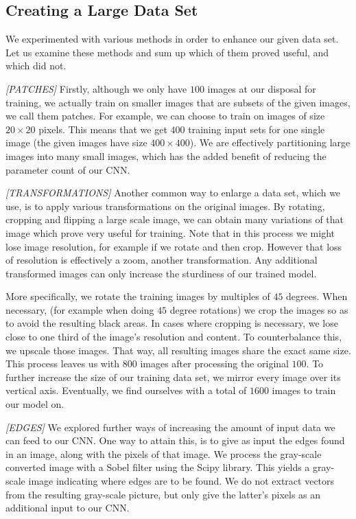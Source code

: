 \documentclass[10pt,conference,compsocconf]{IEEEtran}
\begin{document}
\subsection{Creating a Large Data Set} 
\label{ssec:data_proc}

We experimented with various methods in order to enhance our given data set. Let us examine these methods and sum up which of them proved useful, and which did not.

\textit{[PATCHES]}   
Firstly, although we only have $100$ images at our disposal for training, we actually train on smaller images that are subsets of the given images, we call them patches. For example, we can choose to train on images of size $20 \times 20$ pixels. This means that we get $400$ training input sets for one single image (the given images have size $400 \times 400$). We are effectively partitioning large images into many small images, which has the added benefit of reducing the parameter count of our CNN.

\textit{[TRANSFORMATIONS]}   
Another common way to enlarge a data set, which we use, is to apply various transformations on the original images. By rotating, cropping and flipping a large scale image, we can obtain many variations of that image which prove very useful for training. Note that in this process we might lose image resolution, for example if we rotate and then crop. However that loss of resolution is effectively a zoom, another transformation. Any additional transformed images can only increase the sturdiness of our trained model. 

More specifically, we rotate the training images by multiples of $45$ degrees. When necessary, (for example when doing $45$ degree rotations) we crop the images so as to avoid the resulting black areas. In cases where cropping is necessary, we lose close to one third of the image's resolution and content. To counterbalance this, we upscale those images. That way, all resulting images share the exact same size. This process leaves us with $800$ images after processing the original $100$. To further increase the size of our training data set, we mirror every image over its vertical axis. Eventually, we find ourselves with a total of $1600$ images to train our model on.

\textit{[EDGES]}   
We explored further ways of increasing the amount of input data we can feed to our CNN. One way to attain this, is to give as input the edges found in an image, along with the pixels of that image. We process the gray-scale converted image with a Sobel filter using the Scipy library. This yields a gray-scale image indicating where edges are to be found. We do not extract vectors from the resulting gray-scale picture, but only give the latter's pixels as an additional input to our CNN.
\end{document}
